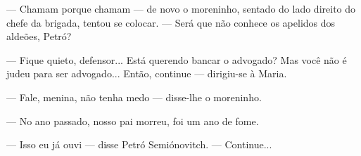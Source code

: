 --- Chamam porque chamam --- de novo o moreninho, sentado do lado
direito do chefe da brigada, tentou se colocar. --- Será que não conhece
os apelidos dos aldeões, Petró?

--- Fique quieto, defensor... Está querendo bancar o advogado? Mas você
não é judeu para ser advogado... Então, continue --- dirigiu-se à Maria.

--- Fale, menina, não tenha medo --- disse-lhe o moreninho.

--- No ano passado, nosso pai morreu, foi um ano de fome.

--- Isso eu já ouvi --- disse Petró Semiónovitch. --- Continue...
